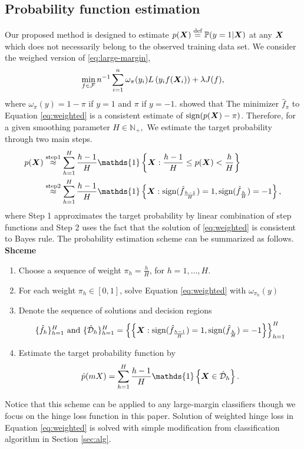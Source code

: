 \documentclass[12pt]{article}
\begin{document}
\subsection{Probability function estimation}
Our proposed method is designed to estimate $p(\bm X)\stackrel{\text{def}}{=}\mathbb{P}(y = 1|\bm X)$ at any $\bm X$ which does not necessarily belong to the observed training data set. We consider the weighed version of \eqref{eq:large-margin},
\begin{align}
\label{eq:weighted}
\min_{f\in\mathcal{F}}n^{-1}\sum_{i=1}^n \omega_{\pi}(y_i)L\left(y_if(\bm X_i)\right)+ \lambda J(f),
\end{align}
where $\omega_\pi(y) = 1-\pi $ if $y = 1$ and $\pi$ if $y = -1$.
\citet{wang2008probability} showed that The minimizer $\hat f_\pi$ to Equation \eqref{eq:weighted} is a consistent estimate of $\text{sign}(p(\bm X)-\pi)$. Therefore,  for a given smoothing parameter $H\in\mathbb{N}_+,$ We estimate the target probability through two main steps.
\begin{align}
\label{eq:approx}
p(\mX) &\stackrel{\text{step1}}{\approx} \sum_{h=1}^H\frac{h-1}{H}\mathds{1}\left\{\mX:\frac{h-1}{H}\leq p(\mX)<\frac{h}{H}\right\}\\&\stackrel{\text{step2}}{\approx} \sum_{h=1}^H\frac{h-1}{H}\mathds{1}\left\{\mX:\text{sign}(\hat f_{\frac{h-1}{H}}) = 1, \text{sign}(\hat f_{\frac{h}{H}}) = -1\right\},
\end{align}
where Step 1 approximates the target probability by linear combination of step functions and Step 2 uses the fact that the solution of \eqref{eq:weighted} is consistent to Bayes rule.
The probability estimation scheme can be summarized as follows.\\
{\bf Shceme}\vspace{-.4cm}
\begin{enumerate}[label={S.\arabic*}]
\item Choose a sequence of weight $\pi_h = \frac{h}{H}$, for $h = 1,\ldots, H$.
\item For each weight $\pi_h\in[0,1]$, solve Equation \eqref{eq:weighted} with $\omega_{\pi_h}(y)$
\item Denote the sequence of solutions and decision regions 
\begin{align}
\{\hat f_h\}_{h=1}^H \text{ and } \{\hat {\mathcal{D}}_h\}_{h=1}^H = \left\{\left\{\bm X:\text{sign}(\hat f_{\frac{h-1}{H}}) = 1, \text{sign}(\hat f_{\frac{h}{H}}) = -1\right\}\right\}_{h=1}^H
\end{align}
\item Estimate the target probability function by 
\begin{align}
\hat p(mX) = \sum_{h=1}^H\frac{h-1}{H}\mathds{1}\left\{\mX\in \hat \tD_h\right\}.
\end{align}
\end{enumerate}
Notice that this scheme can be applied to any large-margin classifiers though we  focus on the hinge loss function in this paper. Solution of weighted hinge loss in Equation \eqref{eq:weighted} is solved with simple modification from classification algorithm in Section \ref{sec:alg}.
\end{document}
